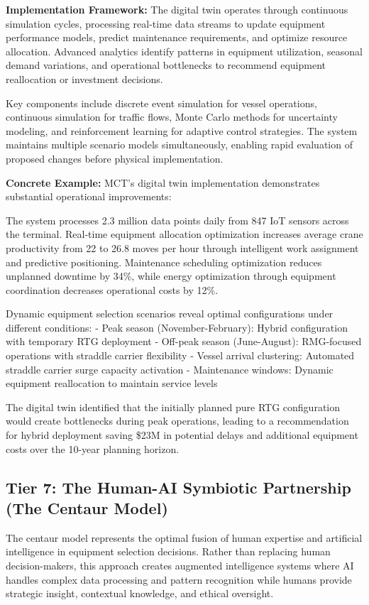 \documentclass{article}
\begin{document}
\textbf{Implementation Framework:}
The digital twin operates through continuous simulation cycles, processing real-time data streams to update equipment performance models, predict maintenance requirements, and optimize resource allocation. Advanced analytics identify patterns in equipment utilization, seasonal demand variations, and operational bottlenecks to recommend equipment reallocation or investment decisions.

Key components include discrete event simulation for vessel operations, continuous simulation for traffic flows, Monte Carlo methods for uncertainty modeling, and reinforcement learning for adaptive control strategies. The system maintains multiple scenario models simultaneously, enabling rapid evaluation of proposed changes before physical implementation.

\textbf{Concrete Example:} MCT's digital twin implementation demonstrates substantial operational improvements:

The system processes 2.3 million data points daily from 847 IoT sensors across the terminal. Real-time equipment allocation optimization increases average crane productivity from 22 to 26.8 moves per hour through intelligent work assignment and predictive positioning. Maintenance scheduling optimization reduces unplanned downtime by 34\%, while energy optimization through equipment coordination decreases operational costs by 12\%.

Dynamic equipment selection scenarios reveal optimal configurations under different conditions:
- Peak season (November-February): Hybrid configuration with temporary RTG deployment
- Off-peak season (June-August): RMG-focused operations with straddle carrier flexibility
- Vessel arrival clustering: Automated straddle carrier surge capacity activation
- Maintenance windows: Dynamic equipment reallocation to maintain service levels

The digital twin identified that the initially planned pure RTG configuration would create bottlenecks during peak operations, leading to a recommendation for hybrid deployment saving \$23M in potential delays and additional equipment costs over the 10-year planning horizon.

\subsection{Tier 7: The Human-AI Symbiotic Partnership (The Centaur Model)}

The centaur model represents the optimal fusion of human expertise and artificial intelligence in equipment selection decisions. Rather than replacing human decision-makers, this approach creates augmented intelligence systems where AI handles complex data processing and pattern recognition while humans provide strategic insight, contextual knowledge, and ethical oversight.
\end{document}
